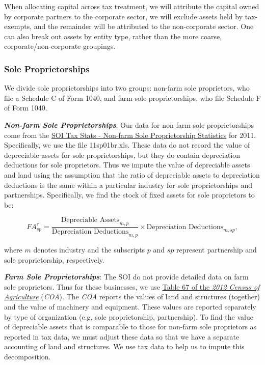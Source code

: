 \documentclass[article,11pt,letterpaper,fleqn]{article}
\theoremstyle{definition}
\numberwithin{equation}{section}
\begin{document}
When allocating capital across tax treatment, we will attribute the capital owned by corporate partners to the corporate sector, we will exclude assets held by tax-exempts, and the remainder will be attributed to the non-corporate sector.  One can also break out assets by entity type, rather than the more coarse, corporate/non-corporate groupings.



\subsubsection{Sole Proprietorships}

We divide sole proprietorships into two groups: non-farm sole proprietors, who file a Schedule C of Form 1040, and farm sole proprietorships, who file Schedule F of Form 1040.  

\textbf{\emph{Non-farm Sole Proprietorships}}:  Our data for non-farm sole proprietorships come from the \href{http://www.irs.gov/uac/SOI-Tax-Stats-Nonfarm-Sole-Proprietorship-Statistics}{SOI Tax Stats - Non-farm Sole Proprietorship Statistics} for 2011.  Specifically, we use the file 11sp01br.xls.  These data do not record the value of depreciable assets for sole proprietorships, but they do contain depreciation deductions for sole proprietors.  Thus we impute the value of depreciable assets and land using the assumption that the ratio of depreciable assets to depreciation deductions is the same within a particular industry for sole proprietorships and partnerships.  Specifically, we find the stock of fixed assets for sole proprietors to be: 

\begin{equation}
{FA}^{\tau}_{sp}=\frac{\text{Depreciable Assets}_{m,p}}{\text{Depreciation Deductions}_{m,p}}\times \text{Depreciation Deductions}_{m,sp},
\end{equation}

\noindent\noindent where $m$ denotes industry and the subscripts $p$ and $sp$ represent partnership and sole proprietorship, respectively.  


\textbf{\emph{Farm Sole Proprietorships}}:  The SOI do not provide detailed data on farm sole proprietors.  Thus for these businesses, we use \href{http://www.agcensus.usda.gov/Publications/2012/Full_Report/Volume_1,_Chapter_1_US/st99_1_067_067.pdf}{Table 67 of the \emph{2012 Census of Agriculture}} (\emph{COA}).  The \emph{COA} reports the values of land and structures (together) and the value of machinery and equipment.  These values are reported separately by type of organization (e.g, sole proprietorship, partnership).  To find the value of depreciable assets that is comparable to those for non-farm sole proprietors as reported in tax data, we must adjust these data so that we have a separate accounting of land and structures.  We use tax data to help us to impute this decomposition.  
\end{document}
